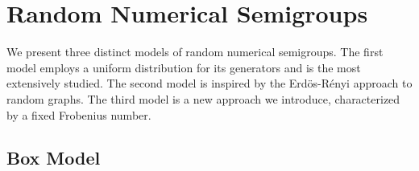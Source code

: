 
\chapter{Random Numerical Semigroups}\label{chap:randnumsems}

We present three distinct models of random numerical semigroups. The first model employs a uniform distribution for its generators and is the most extensively studied. The second model is inspired by the Erdös-Rényi approach to random graphs. The third model is a new approach we introduce, characterized by a fixed Frobenius number.

\section{Box Model}\label{sec:randomsmpgs:intro}

